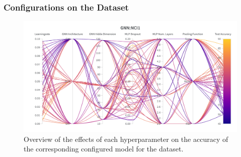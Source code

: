 \subsubsection{\gnn Configurations on the \reddit Dataset}
\begin{figure}[H]
    \centering
    \includegraphics[width=\textwidth, trim={0 75 0 150}, clip]{Figures/hyperparameter_gnn_reddit.png}
    \caption{Overview of the effects of each hyperparameter on the accuracy of the corresponding configured \gnn model for the \reddit dataset.}
\end{figure}
\clearpage

